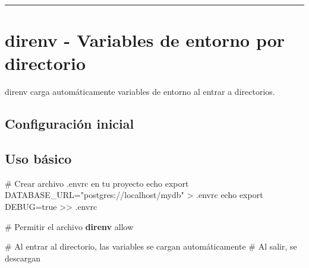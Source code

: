 \documentclass[
  11pt,
  letterpaper,
  oneside,
  openany]{scrbook}
\newenvironment{Shaded}{}{}
\newcommand{\BuiltInTok}[1]{\textcolor[rgb]{0.84,0.23,0.29}{#1}}
\newcommand{\CommentTok}[1]{\textcolor[rgb]{0.42,0.45,0.49}{#1}}
\newcommand{\ExtensionTok}[1]{\textcolor[rgb]{0.84,0.23,0.29}{\textbf{#1}}}
\newcommand{\NormalTok}[1]{\textcolor[rgb]{0.14,0.16,0.18}{#1}}
\newcommand{\OperatorTok}[1]{\textcolor[rgb]{0.14,0.16,0.18}{#1}}
\newcommand{\StringTok}[1]{\textcolor[rgb]{0.01,0.18,0.38}{#1}}
\newcommand{\VariableTok}[1]{\textcolor[rgb]{0.89,0.38,0.04}{#1}}
\begin{document}
\begin{center}\rule{0.5\linewidth}{0.5pt}\end{center}

\section{direnv - Variables de entorno por directorio}\label{sec-direnv}

direnv carga automáticamente variables de entorno al entrar a
directorios.

\subsection{Configuración inicial}\label{configuraciuxf3n-inicial-4}

\begin{Shaded}
\end{Shaded}

\subsection{Uso básico}\label{uso-buxe1sico-9}

\begin{Shaded}
\begin{Highlighting}[]
\CommentTok{\# Crear archivo .envrc en tu proyecto}
\BuiltInTok{echo} \StringTok{\textquotesingle{}export DATABASE\_URL="postgres://localhost/mydb"\textquotesingle{}} \OperatorTok{\textgreater{}}\NormalTok{ .envrc}
\BuiltInTok{echo} \StringTok{\textquotesingle{}export DEBUG=true\textquotesingle{}} \OperatorTok{\textgreater{}\textgreater{}}\NormalTok{ .envrc}

\CommentTok{\# Permitir el archivo}
\ExtensionTok{direnv}\NormalTok{ allow}

\CommentTok{\# Al entrar al directorio, las variables se cargan automáticamente}
\CommentTok{\# Al salir, se descargan}
\end{Highlighting}
\end{Shaded}
\end{document}

